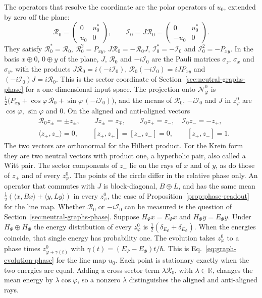 \documentclass[11pt]{article}
\theoremstyle{definition}
\begin{document}
The operators that resolve the coordinate are the polar operators of $u_0$, extended by zero off the plane:
\begin{equation}
 \mathcal R_0=\begin{pmatrix}0&u_0^*\\ u_0&0\end{pmatrix},\qquad
 \mathcal I_0=J\mathcal R_0=\begin{pmatrix}0&u_0^*\\ -u_0&0\end{pmatrix}.
 \label{eq:ground-plane-operators}
\end{equation}
They satisfy $\mathcal R_0^*=\mathcal R_0$, $\mathcal R_0^2=P_{xy}$, $J\mathcal R_0=-\mathcal R_0J$, $\mathcal I_0^*=-\mathcal I_0$ and $\mathcal I_0^2=-P_{xy}$. In the basis $x\oplus0$, $0\oplus y$ of the plane, $J$, $\mathcal R_0$ and $-i\mathcal I_0$ are the Pauli matrices $\sigma_z$, $\sigma_x$ and $\sigma_y$, with the products $J\mathcal R_0=i(-i\mathcal I_0)$, $\mathcal R_0(-i\mathcal I_0)=iJP_{xy}$ and $(-i\mathcal I_0)J=i\mathcal R_0$. This is the sector coordinate of Section~\ref{sec:neutral-graphs-phase} for a one-dimensional input space. The projection onto $\mathcal N^0_\varphi$ is $\tfrac12\bigl(P_{xy}+\cos\varphi\,\mathcal R_0+\sin\varphi\,(-i\mathcal I_0)\bigr)$, and the means of $\mathcal R_0$, $-i\mathcal I_0$ and $J$ in $z^0_\varphi$ are $\cos\varphi$, $\sin\varphi$ and $0$. On the aligned and anti-aligned vectors
\begin{align}
 &\mathcal R_0z_\pm=\pm z_\pm,\qquad Jz_\pm=z_\mp,\qquad
 \mathcal I_0z_+=z_-,\quad \mathcal I_0z_-=-z_+ ,
 \label{eq:ground-plane-eigenlines}\\
 &\langle z_+,z_-\rangle=0,\qquad [z_+,z_+]=[z_-,z_-]=0,\qquad [z_+,z_-]=1 .
 \label{eq:ground-plane-witt}
\end{align}
The two vectors are orthonormal for the Hilbert product. For the Krein form they are two neutral vectors with product one, a hyperbolic pair, also called a Witt pair. The sector components of $z_-$ lie on the rays of $x$ and of $y$, as do those of $z_+$ and of every $z^0_\varphi$. The points of the circle differ in the relative phase only. An operator that commutes with $J$ is block-diagonal, $B\oplus L$, and has the same mean $\tfrac12(\langle x,Bx\rangle+\langle y,Ly\rangle)$ in every $z^0_\varphi$, the case of Proposition~\ref{prop:phase-readout} for the line map. Whether $\mathcal R_0$ or $-i\mathcal I_0$ can be measured is the question of Section~\ref{sec:neutral-graphs-phase}. Suppose $H_\Psi x=E_\Psi x$ and $H_\Phi y=E_\Phi y$. Under $H_\Psi\oplus H_\Phi$ the energy distribution of every $z^0_\varphi$ is $\tfrac12(\delta_{E_\Psi}+\delta_{E_\Phi})$. When the energies coincide, that single energy has probability one. The evolution takes $z^0_\varphi$ to a phase times $z^0_{\varphi+\gamma(t)}$ with $\gamma(t)=(E_\Psi-E_\Phi)t/\hbar$. This is Eq.~\eqref{eq:graph-evolution-phase} for the line map $u_0$. Each point is stationary exactly when the two energies are equal. Adding a cross-sector term $\lambda\mathcal R_0$, with $\lambda\in\mathbb R$, changes the mean energy by $\lambda\cos\varphi$, so a nonzero $\lambda$ distinguishes the aligned and anti-aligned rays.
\end{document}
